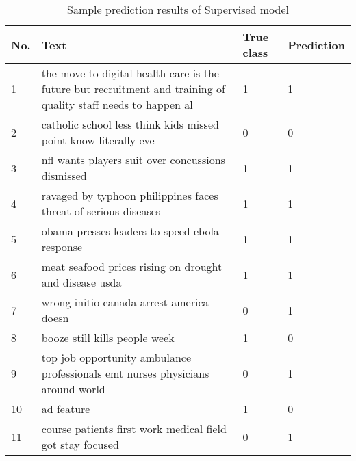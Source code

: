 \begin{table}[!htbp]
    \centering
    \hspace{0.5cm}
    \begin{tabular}{|p{15pt}|p{250pt}|p{60pt}|p{60pt}|}
        \hline
        No. & Text & True class & Prediction \\ \hline
        1 & the move to digital health care is the future but recruitment and training of quality staff needs to happen al & 1 & 1 \\\hline
        2 & catholic school less think kids missed point know literally eve & 0 & 0 \\\hline
        3 & nfl wants players suit over concussions dismissed & 1 & 1\\\hline
        4 & ravaged by typhoon philippines faces threat of serious diseases & 1 & 1 \\\hline
        5 & obama presses leaders to speed ebola response & 1 & 1 \\\hline
        6 & meat seafood prices rising on drought and disease usda & 1 & 1 \\\hline
        7 & wrong initio canada arrest america doesn & 0 & 1 \\\hline
        8 & booze still kills people week & 1 & 0 \\\hline
        9 & top job opportunity ambulance professionals emt nurses physicians around world & 0 & 1 \\\hline
        10 & ad feature & 1 & 0 \\\hline
        11 & course patients first work medical field got stay focused & 0 & 1 \\\hline
    \end{tabular}
    \caption{Sample prediction results of Supervised model}
    \label{tab:sup1}
\end{table}

